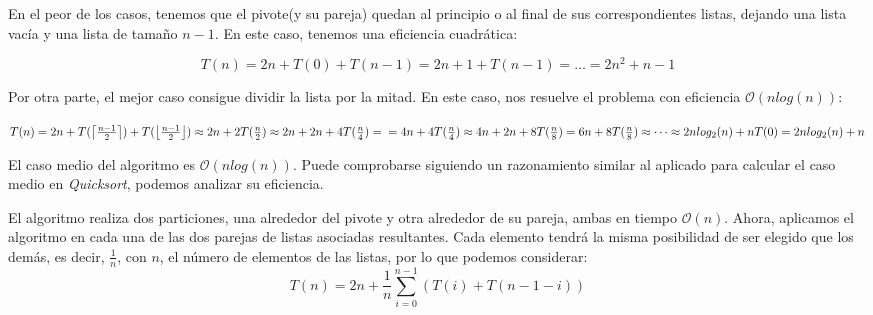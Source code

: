 \documentclass[a4paper, 11pt]{article} %
\begin{document}
      En el peor de los casos, tenemos que el pivote(y su pareja) quedan al principio o al final de sus correspondientes listas, dejando una lista vacía y una lista de tamaño $n-1$. En este caso, tenemos una eficiencia cuadrática:
      
	  \begin{equation}
	  	T(n) = 2n + T(0) + T(n-1) = 2n + 1 + T(n-1) = \dots = 2n^2 + n - 1
	  \end{equation}
      
      Por otra parte, el mejor caso consigue dividir la lista por la mitad. En este caso, nos resuelve el problema con eficiencia $\mathcal{O}(nlog(n))$:
      
	  	$T(n) = 2n + T(\left\lceil \frac{n-1}{2} \right\rceil) + T(\left\lfloor \frac{n-1}{2}\right\rfloor) \approx 2n + 2T(\frac{n}{2}) \approx 2n + 2n + 4T(\frac{n}{4}) = \\ = 4n + 4T(\frac{n}{4})\approx 4n + 2n + 8T(\frac{n}{8}) = 6n + 8T(\frac{n}{8}) \approx \dots \approx 2nlog_2(n) + n T(0) = 2nlog_2(n) + n$
      
      El caso medio del algoritmo es $\mathcal{O}(nlog(n)) $. Puede comprobarse siguiendo un razonamiento similar al aplicado para calcular el caso medio en \textit{Quicksort}, podemos analizar su eficiencia.
    
      El algoritmo realiza dos particiones, una alrededor del pivote y otra alrededor de su pareja, ambas en tiempo $\mathcal{O}(n)$. Ahora, aplicamos el algoritmo
      en cada una de las dos parejas de listas asociadas resultantes. Cada elemento tendrá la misma posibilidad de ser elegido que los demás, es decir, $\frac{1}{n}$,
      con $n$, el número de elementos de las listas, por lo que podemos considerar:
      \begin{equation}
		T(n) = 2n + \frac{1}{n}\sum_{i=0}^{n-1}\left(T(i) + T(n-1-i) \right)
      \end{equation}
      
\end{document}
